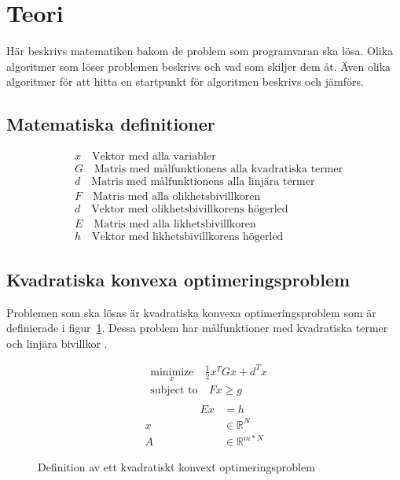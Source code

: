 \section{Teori}
Här beskrivs matematiken bakom de problem som programvaran ska lösa. Olika algoritmer som löser problemen beskrivs och vad som skiljer dem åt. Även olika algoritmer för att hitta en startpunkt för algoritmen beskrivs och jämförs.

\subsection{Matematiska definitioner}
\begin{equation*}
\begin{aligned}
&x  \quad \text{Vektor med alla variabler}\\
&G  \quad \text{Matris med målfunktionens alla kvadratiska termer}\\
&d  \quad \text{Matris med målfunktionens alla linjära termer}\\
&F  \quad \text{Matris med alla olikhetsbivillkoren}\\
&d  \quad \text{Vektor med olikhetsbivillkorens högerled}\\
&E  \quad \text{Matris med alla likhetsbivillkoren}\\
&h  \quad \text{Vektor med likhetsbivillkorens högerled}
\end{aligned}
\end{equation*}

\subsection{Kvadratiska konvexa optimeringsproblem}
Problemen som ska lösas är kvadratiska konvexa optimeringsproblem som är definierade i figur~\ref{fig:qp_def}. Dessa problem har målfunktioner med kvadratiska termer och linjära bivillkor \citep{numericaloptimization}.
\begin{figure}[H]
\begin{equation*}
\begin{aligned}
& \underset{x}{\text{minimize}} \quad \frac{1}{2} x^{T}Gx+d^{T}x \\
& \text{subject to} \quad Fx\geq g \\
\end{aligned}
\end{equation*}
\begin{equation*}
\begin{aligned}
	\quad \quad \quad \quad \quad Ex &= h \\
		x &\in \mathbb{R}^N \\
		A &\in \mathbb{R}^{m*N}
\end{aligned}
\end{equation*}
\caption{Definition av ett kvadratiskt konvext optimeringsproblem}
\label{fig:qp_def}
\end{figure}


